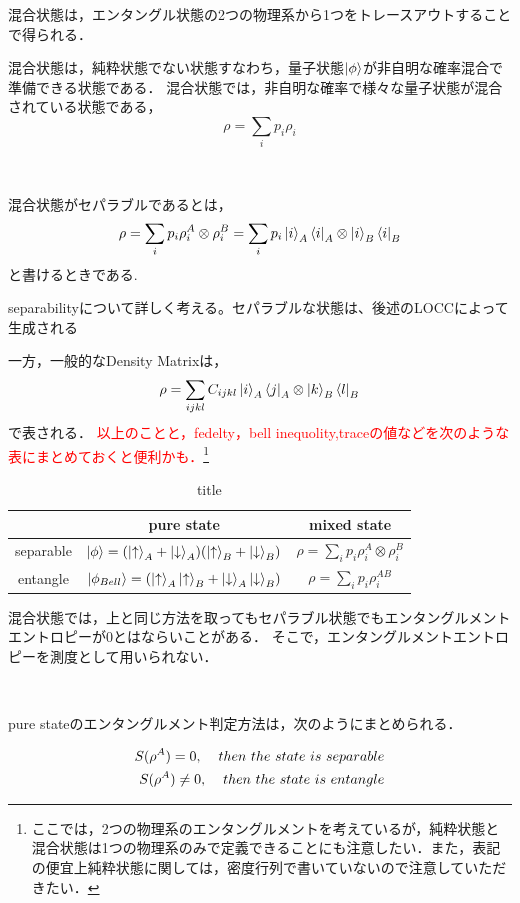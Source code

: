 混合状態は，エンタングル状態の2つの物理系から1つをトレースアウトすることで得られる．



混合状態は，純粋状態でない状態すなわち，量子状態$\ket{\phi}$が非自明な確率混合で準備できる状態である．
混合状態では，非自明な確率で様々な量子状態が混合されている状態である，
\begin{equation}
\rho=\sum_{i}p_i\rho_{i}
\end{equation}
\begin{empheqboxed}
  \
  \

  混合状態がセパラブルであるとは，
  \begin{equation}
  \label{30}
  \rho=\sum_{i}p_i\rho^{A}_{i}\otimes\rho^{B}_{i}=\sum_{i}p_i\ket{i}_A\bra{i}_{A}\otimes\ket{i}_B\bra{i}_{B}
  \end{equation}
  と書けるときである.
\end{empheqboxed}
separabilityについて詳しく考える。セパラブルな状態は、後述のLOCCによって生成される

一方，一般的なDensity Matrixは，
\begin{eqnarray}
\label{40}
\rho=\sum_{ijkl}C_{ijkl}\ket{i}_A\bra{j}_{A}\otimes\ket{k}_B\bra{l}_{B}
\end{eqnarray}
で表される．
\textcolor{red}{以上のことと，fedelty，bell inequolity,traceの値などを次のような表にまとめておくと便利かも．}\footnote{ここでは，2つの物理系のエンタングルメントを考えているが，純粋状態と混合状態は1つの物理系のみで定義できることにも注意したい．また，表記の便宜上純粋状態に関しては，密度行列で書いていないので注意していただきたい．}
{\renewcommand{\arraystretch}{2}
\begin{table}[H]
  \begin{center}
    \begin{tabular}{c|c|c}
       & pure state & mixed state  \\\hline
      separable & $ \ket{\phi}=(\ket{\uparrow}_{A}+\ket{\downarrow}_{A})(\ket{\uparrow}_{B} +\ket{\downarrow}_{B})$ & $\rho=\sum_{i}p_i\rho^{A}_{i}\otimes\rho^{B}_{i}$ \\\hline
      entangle &    $\ket{\phi_{Bell}}=(\ket{\uparrow}_{A}\ket{\uparrow}_{B}+\ket{\downarrow}_{A}\ket{\downarrow}_{B})$  & $\rho=\sum_{i}p_i\rho^{AB}_{i}$
    \end{tabular}
  \end{center}
  \caption{title}
\end{table}}

混合状態では，上と同じ方法を取ってもセパラブル状態でもエンタングルメントエントロピーが$0$とはならいことがある．
そこで，エンタングルメントエントロピーを測度として用いられない．
\begin{empheqboxed}
  \
  \

  pure stateのエンタングルメント判定方法は，次のようにまとめられる．

  \begin{align}
    S(\rho^{A})=0, \hspace{4mm} then\ the\ state\ is\ separable\\
    S(\rho^{A})\neq0, \hspace{4mm} then\ the\ state\ is\ entangle
  \end{align}
\end{empheqboxed}

